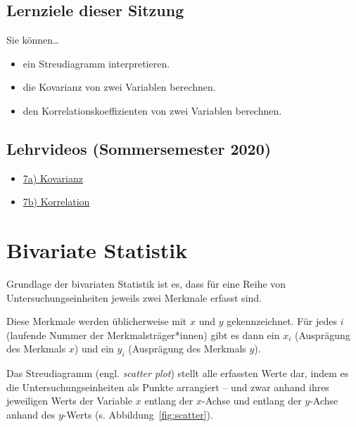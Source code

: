 \documentclass[
  11pt,
  ngerman,
  a4paper,
]{report}
\providecommand{\tightlist}{%
  \setlength{\itemsep}{0pt}\setlength{\parskip}{0pt}}
\begin{document}
\hypertarget{lernziele-dieser-sitzung-6}{%
\subsection*{Lernziele dieser Sitzung}\label{lernziele-dieser-sitzung-6}}

Sie können\ldots{}

\begin{itemize}
\tightlist
\item
  ein Streudiagramm interpretieren.
\item
  die Kovarianz von zwei Variablen berechnen.
\item
  den Korrelationskoeffizienten von zwei Variablen berechnen.
\end{itemize}

\hypertarget{lehrvideos-sommersemester-2020-3}{%
\subsection*{Lehrvideos (Sommersemester 2020)}\label{lehrvideos-sommersemester-2020-3}}

\begin{itemize}
\tightlist
\item
  \href{https://video01.uni-frankfurt.de/Mediasite/Play/ec3868ddd44f4d7490450b87723ad9cf1d}{7a) Kovarianz}
\item
  \href{https://video01.uni-frankfurt.de/Mediasite/Play/a70c949180d84883a8bd2324d89922fe1d}{7b) Korrelation}
\end{itemize}

\hypertarget{bivariate-statistik}{%
\section{Bivariate Statistik}\label{bivariate-statistik}}

Grundlage der bivariaten Statistik ist es, dass für eine Reihe von Untersuchungseinheiten jeweils zwei Merkmale erfasst sind.

Diese Merkmale werden üblicherweise mit \(x\) und \(y\) gekennzeichnet. Für jedes \(i\) (laufende Nummer der Merkmalsträger*innen) gibt es dann ein \(x_i\) (Ausprägung des Merkmals \(x\)) und ein \(y_i\) (Ausprägung des Merkmals \(y\)).

Das Streudiagramm (engl. \emph{scatter plot}) stellt alle erfassten Werte dar, indem es die Untersuchungseinheiten als Punkte arrangiert -- und zwar anhand ihres jeweiligen Werts der Variable \(x\) entlang der \(x\)-Achse und entlang der \(y\)-Achse anhand des \(y\)-Werts (s. Abbildung~\ref{fig:scatter}).
\end{document}
